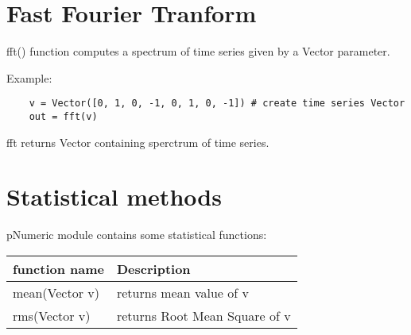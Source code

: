 \documentclass{article}
\begin{document}
\section{Fast Fourier Tranform \label{fft}}
    fft() function computes a spectrum of time series given by a Vector parameter.
    
    Example:
    \begin{verbatim}
    v = Vector([0, 1, 0, -1, 0, 1, 0, -1]) # create time series Vector
    out = fft(v)
    \end{verbatim}
    
    fft returns Vector containing sperctrum of time series.
    
\section{Statistical methods \label{statmeth}}
    pNumeric module contains some statistical functions:

    \begin{tabular}{|l|l|} \hline
    \textbf{function name} & \textbf{Description} \\ \hline
    mean(Vector v)     & returns mean value of v \\
    rms(Vector v)      & returns Root Mean Square of v \\
    \end{tabular}
\end{document}
